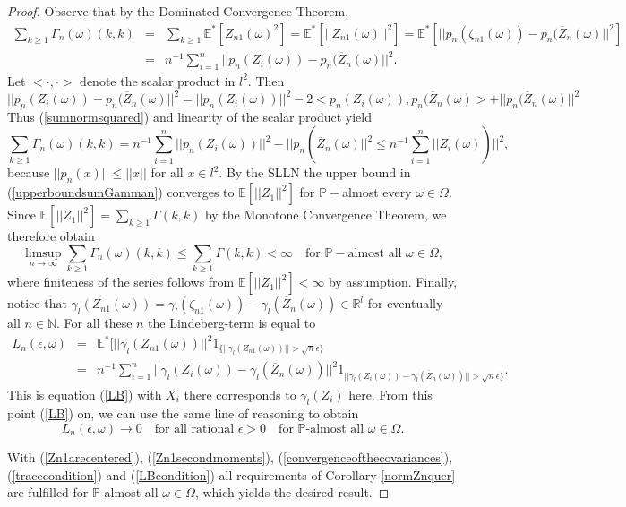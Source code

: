 \documentclass[sn-mathphys,Numbered]{sn-jnl}%
\theoremstyle{thmstyleone}%
\theoremstyle{thmstyletwo}%
\theoremstyle{thmstylethree}%
\begin{document}
\begin{proof}
Observe that by the Dominated Convergence Theorem,
\begin{eqnarray}
 \sum_{k \ge 1}\Gamma_n(\omega)(k,k)&=& \sum_{k \ge 1}\mathbb{E}^*[Z_{n1}(\omega)^2]= \mathbb{E}^*[||Z_{n1}(\omega)||^2]=\mathbb{E}^*[||p_n(\zeta_{n1}(\omega))-p_n(\overline{Z}_n(\omega)||^2] \nonumber\\
 &=& n^{-1}\sum_{i=1}^n ||p_n(Z_i(\omega))-p_n(\overline{Z}_n(\omega)||^2. \label{sumnormsquared}
\end{eqnarray}
Let $<\cdot,\cdot>$ denote the scalar product in $l^2$. Then
$$
||p_n(Z_i(\omega))-p_n(\overline{Z}_n(\omega)||^2 = ||p_n(Z_i(\omega))||^2 - 2<p_n(Z_i(\omega)),p_n(\overline{Z}_n(\omega)>+||p_n(\overline{Z}_n(\omega)||^2
$$
Thus (\ref{sumnormsquared}) and linearity of the scalar product yield
\begin{equation} \label{upperboundsumGamman}
 \sum_{k \ge 1}\Gamma_n(\omega)(k,k)= n^{-1}\sum_{i=1}^n ||p_n(Z_i(\omega))||^2-||p_n(\overline{Z}_n(\omega)||^2 \le  n^{-1}\sum_{i=1}^n ||Z_i(\omega))||^2,
\end{equation}
because $||p_n(x)|| \le ||x||$ for all $x \in l^2.$ By the SLLN the upper bound in (\ref{upperboundsumGamman}) converges to $\mathbb{E}[||Z_1||^2]$ for $\mathbb{P}-$almost every $\omega \in \Omega$. Since $\mathbb{E}[||Z_1||^2]=\sum_{k \ge 1}\Gamma(k,k)$ by the Monotone Convergence Theorem, we therefore obtain
\begin{equation} \label{tracecondition}
 \limsup_{n \rightarrow \infty}\sum_{k \ge 1}\Gamma_n(\omega)(k,k) \le \sum_{k \ge 1}\Gamma(k,k)<\infty \quad \text{for }\mathbb{P-}\text{almost all } \omega \in \Omega,
\end{equation}
where finiteness of the series follows from $\mathbb{E}[||Z_1||^2]< \infty$ by assumption. Finally, notice that
$\gamma_l(Z_{n1}(\omega))= \gamma_l(\zeta_{n1}(\omega))-\gamma_l(\overline{Z}_n(\omega)) \in \mathbb{R}^l$ for eventually all $n \in \mathbb{N}$.
For all these $n$ the Lindeberg-term is equal to
\begin{eqnarray*}
 L_n(\epsilon,\omega)&=&\mathbb{E}^*[||\gamma_l(Z_{n1}(\omega))||^2 1_{\{||\gamma_l(Z_{n1}(\omega))||> \sqrt{n} \epsilon\}}\\
  &=& n^{-1}\sum_{i=1}^n ||\gamma_l(Z_i(\omega))-\gamma_l(\overline{Z}_n(\omega))||^2 1_{||\gamma_l(Z_i(\omega))-\gamma_l(\overline{Z}_n(\omega))||>\sqrt{n} \epsilon\}}.
\end{eqnarray*}
This is equation (\ref{LB}) with $X_i$ there corresponds to $\gamma_l(Z_i)$ here. From this point (\ref{LB}) on, we can use the same line of reasoning to obtain
\begin{equation} \label{LBcondition}
 L_n(\epsilon,\omega) \rightarrow 0 \quad \text{for all rational } \epsilon >0 \quad \text{for }\mathbb{P}\text{-almost all } \omega \in \Omega.
\end{equation}

With (\ref{Zn1arecentered}), (\ref{Zn1secondmoments}), (\ref{convergenceofthecovariances}), (\ref{tracecondition}) and (\ref{LBcondition})
all requirements of Corollary \ref{normZnquer} are fulfilled for $\mathbb{P}$-almost all $\omega \in \Omega$, which yields the desired result.
\end{proof}
\end{document}
